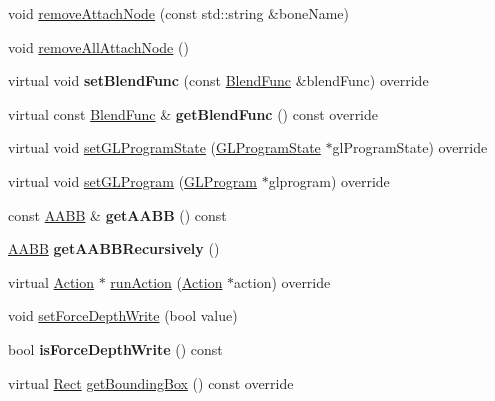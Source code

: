 \begin{DoxyCompactItemize}
\item 
void \hyperlink{classSprite3D_a39e52d6b3fc8cf7e8fe5dfb047880308}{remove\+Attach\+Node} (const std\+::string \&bone\+Name)
\item 
void \hyperlink{classSprite3D_a65c7b8151da52aa226c6fd89942da971}{remove\+All\+Attach\+Node} ()
\item 
\mbox{\label{classSprite3D_aef1f594bbd90021e7f52198098d840ff}} 
virtual void {\bfseries set\+Blend\+Func} (const \hyperlink{structBlendFunc}{Blend\+Func} \&blend\+Func) override
\item 
\mbox{\label{classSprite3D_a4b4edccac127347bbe18148e95652ed5}} 
virtual const \hyperlink{structBlendFunc}{Blend\+Func} \& {\bfseries get\+Blend\+Func} () const override
\item 
virtual void \hyperlink{classSprite3D_ab9e57d29350dc6886360d433c023b935}{set\+G\+L\+Program\+State} (\hyperlink{classGLProgramState}{G\+L\+Program\+State} $\ast$gl\+Program\+State) override
\item 
virtual void \hyperlink{classSprite3D_addcfa64162310ce40ec097738442af9f}{set\+G\+L\+Program} (\hyperlink{classGLProgram}{G\+L\+Program} $\ast$glprogram) override
\item 
\mbox{\label{classSprite3D_adb3d7d712a7b8fd6a61d970b8a5d3f7f}} 
const \hyperlink{classAABB}{A\+A\+BB} \& {\bfseries get\+A\+A\+BB} () const
\item 
\mbox{\label{classSprite3D_a53f4be4106345801999a7d55a1984553}} 
\hyperlink{classAABB}{A\+A\+BB} {\bfseries get\+A\+A\+B\+B\+Recursively} ()
\item 
virtual \hyperlink{classAction}{Action} $\ast$ \hyperlink{classSprite3D_a6447200e96db21bc79df873e598fcf4a}{run\+Action} (\hyperlink{classAction}{Action} $\ast$action) override
\item 
void \hyperlink{classSprite3D_ae6bea19d97b02dfecb63d8975600aa4a}{set\+Force\+Depth\+Write} (bool value)
\item 
\mbox{\label{classSprite3D_abcf25050e0c2fe4ab2f816b95e1919c2}} 
bool {\bfseries is\+Force\+Depth\+Write} () const
\item 
virtual \hyperlink{classRect}{Rect} \hyperlink{classSprite3D_a45348972b8ce7b37c061b9888b00613a}{get\+Bounding\+Box} () const override
\item 

\end{DoxyCompactItemize}
